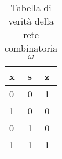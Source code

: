 \begin{table}[H]
	\centering
	\caption{Tabella di verità della rete combinatoria $ \omega $}
	\label{tab:mealyomega1}
	\begin{tabular}{|ll|l|}
		\hline
		x & s & z \\ \hline
		0 & 0 & 1 \\
		1 & 0 & 0 \\
		0 & 1 & 0 \\
		1 & 1 & 1 \\ \hline
	\end{tabular}
\end{table}


